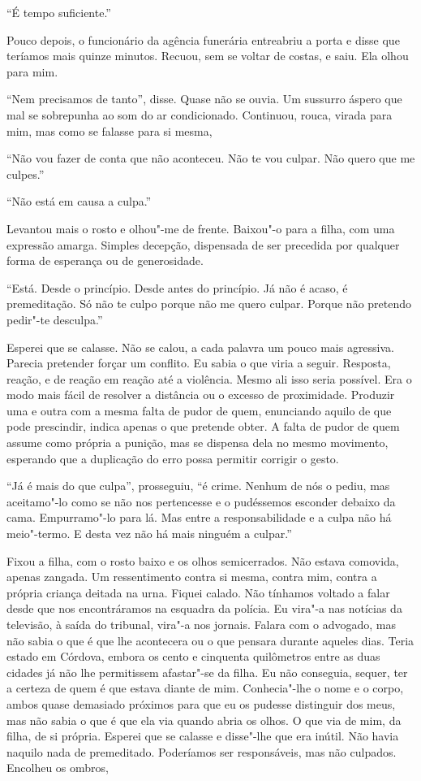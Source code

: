 ``É tempo suficiente.''

Pouco depois, o funcionário da agência funerária entreabriu a porta e
disse que teríamos mais quinze minutos. Recuou, sem se voltar de costas,
e saiu. Ela olhou para mim.

``Nem precisamos de tanto'',
disse. Quase não se ouvia. Um sussurro áspero que mal se sobrepunha ao
som do ar condicionado. Continuou, rouca, virada para mim, mas como se
falasse para si mesma,

``Não vou fazer de conta que não aconteceu. Não te vou culpar. Não quero
que me culpes.''

``Não está em causa a culpa.''

Levantou mais o rosto e olhou"-me de frente. Baixou"-o para a filha, com
uma expressão amarga. Simples decepção, dispensada de ser precedida por
qualquer forma de esperança ou de generosidade.

``Está. Desde o princípio. Desde antes do princípio. Já não é acaso, é
premeditação. Só não te culpo porque não me quero culpar. Porque não
pretendo pedir"-te desculpa.''

Esperei que se calasse. Não se calou, a cada palavra um pouco mais
agressiva. Parecia pretender forçar um conflito. Eu sabia o que viria a
seguir. Resposta, reação, e de reação em reação até a violência.
Mesmo ali isso seria possível. Era o modo mais fácil de resolver a
distância ou o excesso de proximidade. Produzir uma e outra com a mesma
falta de pudor de quem, enunciando aquilo de que pode prescindir, indica
apenas o que pretende obter. A falta de pudor de quem assume como
própria a punição, mas se dispensa dela no mesmo movimento, esperando
que a duplicação do erro possa permitir corrigir o gesto.

``Já é mais do que culpa'',
prosseguiu,
``é crime. Nenhum de nós o pediu, mas aceitamo"-lo como se não nos
pertencesse e o pudéssemos esconder debaixo da cama. Empurramo"-lo para
lá. Mas entre a responsabilidade e a culpa não há meio"-termo. E desta
vez não há mais ninguém a culpar.''

Fixou a filha, com o rosto baixo e os olhos semicerrados. Não estava
comovida, apenas zangada. Um ressentimento contra si mesma, contra mim,
contra a própria criança deitada na urna. Fiquei calado. Não tínhamos
voltado a falar desde que nos encontráramos na esquadra da polícia. Eu
vira"-a nas notícias da televisão, à saída do tribunal, vira"-a nos
jornais. Falara com o advogado, mas não sabia o que é que lhe acontecera
ou o que pensara durante aqueles dias. Teria estado em Córdova, embora
os cento e cinquenta quilômetros entre as duas cidades já não lhe
permitissem afastar"-se da filha. Eu não conseguia, sequer, ter a
certeza de quem é que estava diante de mim. Conhecia"-lhe o nome e o
corpo, ambos quase demasiado próximos para que eu os pudesse distinguir
dos meus, mas não sabia o que é que ela via quando abria os olhos. O que
via de mim, da filha, de si própria. Esperei que se calasse e disse"-lhe
que era inútil. Não havia naquilo nada de premeditado. Poderíamos ser
responsáveis, mas não culpados. Encolheu os ombros,

